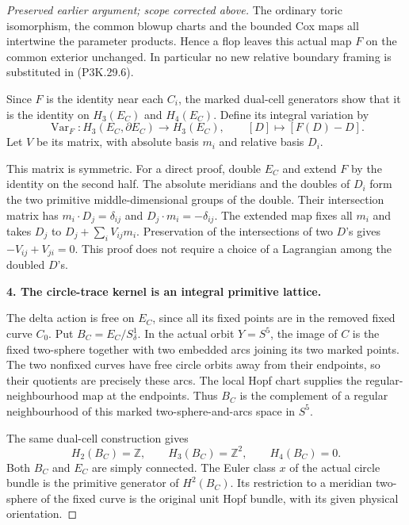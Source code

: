 \begin{proof}[Preserved earlier argument; scope corrected above]
The ordinary toric isomorphism, the common blowup charts and
the bounded Cox maps all intertwine the parameter products.
Hence a flop leaves this actual map \(F\) on the common
exterior unchanged. In particular no new relative boundary
framing is substituted in (P3K.29.6).

Since \(F\) is the identity near each \(C_i\), the marked
dual-cell generators show that it is the identity on
\(H_3(E_C)\) and \(H_4(E_C)\). Define its integral variation by
\[
 \operatorname{Var}_F:H_3(E_C,\partial E_C)\longrightarrow
 H_3(E_C),\qquad [D]\longmapsto[F(D)-D].
                                                        \tag{P3K.29.8}
\]
Let \(V\) be its matrix, with absolute basis \(m_i\) and
relative basis \(D_i\).

This matrix is symmetric. For a direct proof, double \(E_C\)
and extend \(F\) by the identity on the second half. The
absolute meridians and the doubles of \(D_i\) form the two
primitive middle-dimensional groups of the double. Their
intersection matrix has \(m_i\cdot D_j=\delta_{ij}\) and
\(D_j\cdot m_i=-\delta_{ij}\). The extended map fixes all
\(m_i\) and takes \(D_j\) to \(D_j+\sum_iV_{ij}m_i\).
Preservation of the intersections of two \(D\)'s gives
\(-V_{ij}+V_{ji}=0\). This proof does not require a choice
of a Lagrangian among the doubled \(D\)'s.

\par\medskip\noindent\textbf{4. The circle-trace kernel is an integral primitive lattice.}\enspace

The delta action is free on \(E_C\), since all its fixed points
are in the removed fixed curve \(C_0\). Put
\(B_C=E_C/S^1_\delta\). In the actual orbit \(Y=S^5\), the
image of \(C\) is the fixed two-sphere together with two
embedded arcs joining its two marked points. The two
nonfixed curves have free circle orbits away from their
endpoints, so their quotients are precisely these arcs.
The local Hopf chart supplies the regular-neighbourhood
map at the endpoints. Thus \(B_C\) is the complement of a
regular neighbourhood of this marked two-sphere-and-arcs
space in \(S^5\).

The same dual-cell construction gives
\[
 H_2(B_C)=\mathbb Z,\qquad H_3(B_C)=\mathbb Z^2,\qquad
 H_4(B_C)=0.
                                                        \tag{P3K.29.9}
\]
Both \(B_C\) and \(E_C\) are simply connected. The Euler
class \(x\) of the actual circle bundle is the primitive
generator of \(H^2(B_C)\). Its restriction to a meridian
two-sphere of the fixed curve is the original unit Hopf
bundle, with its given physical orientation.


\end{proof}
